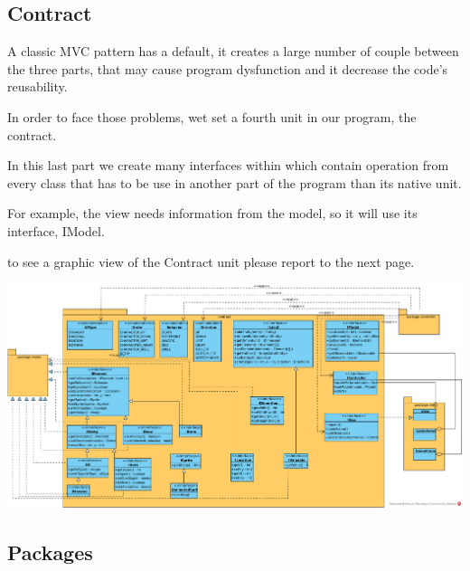 \documentclass{report}
\begin{document}
\subsection{Contract}

A classic MVC pattern has a default, it creates a large number of couple between the three parts, that may cause program dysfunction and it decrease the code’s reusability.

In order to face those problems, wet set a fourth unit in our program, the contract. 

In this last part we create many interfaces within which contain operation from every class that has to be use in another part of the program than its native unit.

For example, the view needs information from the model, so it will use its interface, IModel.

to see a graphic view of the Contract unit please report to the next page.

\begin{landscape}

\vspace*{\fill}

\includegraphics[scale=0.56]{resources/SVG/contract.pdf}

\vspace*{\fill}

\end{landscape}

\subsection{Packages}
\end{document}
